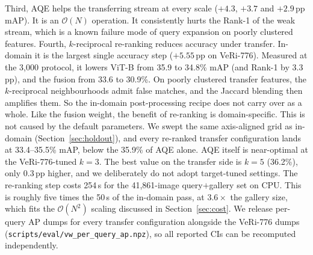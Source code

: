Third, AQE helps the transferring stream at every scale ($+4.3$, $+3.7$ and $+2.9$\,pp mAP). It is an $\mathcal{O}(N)$ operation. It consistently hurts the Rank-1 of the weak stream, which is a known failure mode of query expansion on poorly clustered features. Fourth, $k$-reciprocal re-ranking reduces accuracy under transfer. In-domain it is the largest single accuracy step ($+5.55$\,pp on VeRi-776). Measured at the 3{,}000 protocol, it lowers ViT-B from 35.9 to 34.8\% mAP (and Rank-1 by 3.3\,pp), and the fusion from 33.6 to 30.9\%. On poorly clustered transfer features, the $k$-reciprocal neighbourhoods admit false matches, and the Jaccard blending then amplifies them. So the in-domain post-processing recipe does not carry over as a whole. Like the fusion weight, the benefit of re-ranking is domain-specific. This is not caused by the default parameters. We swept the same axis-aligned grid as in-domain (Section~\ref{sec:holdout}), and every re-ranked transfer configuration lands at 33.4--35.5\% mAP, below the 35.9\% of AQE alone. AQE itself is near-optimal at the VeRi-776-tuned $k{=}3$. The best value on the transfer side is $k{=}5$ (36.2\%), only $0.3$\,pp higher, and we deliberately do not adopt target-tuned settings. The re-ranking step costs 254\,s for the 41{,}861-image query$+$gallery set on CPU. This is roughly five times the 50\,s of the in-domain pass, at $3.6\times$ the gallery size, which fits the $\mathcal{O}(N^{2})$ scaling discussed in Section~\ref{sec:cost}. We release per-query AP dumps for every transfer configuration alongside the VeRi-776 dumps (\texttt{scripts/eval/vw\_per\_query\_ap.npz}), so all reported CIs can be recomputed independently.

